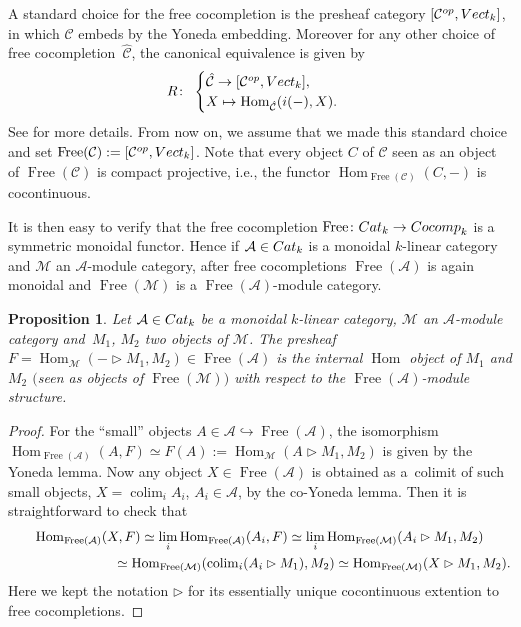 \documentclass[11pt]{article}
\numberwithin{equation}{section}
\numberwithin{equation}{section}
\newtheorem{Proposition}[Theorem]{Proposition}
 { \theoremstyle{definition}
\newtheorem{Definition}[Theorem]{Definition}
\newtheorem{Note}[Theorem]{Note}
\newtheorem{Example}[Theorem]{Example}
\newtheorem{Remark}[Theorem]{Remark} }
\newcommand{\Free}{\operatorname{Free}}
\newcommand{\colim}{\operatorname{colim}}
\newcommand{\Hom}{\operatorname{Hom}}
\begin{document}
\begin{Remark}\label{rmkFreeIsPresheaves}
A standard choice for the free cocompletion is the presheaf category $[\mathcal{C}^{\rm op},{\rm Vect}_k]$, in which $\mathcal{C}$ embeds by the Yoneda embedding. Moreover for any other choice of free cocompletion~$\hat{\mathcal{C}}$, the canonical equivalence is given by
\[
R\colon\ \begin{cases}
\hat{\mathcal{C}}  \to  [\mathcal{C}^{\rm op},{\rm Vect}_k],
\\
X \mapsto  \Hom_{\hat{\mathcal{C}}}(i(-),X).\end{cases}
\]
See \cite[Section~2.2]{Dugger} for more details. From now on, we assume that we made this standard choice and set $\Free(\mathcal{C}) := [\mathcal{C}^{\rm op},{\rm Vect}_k]$.
Note that every object $C$ of $\mathcal{C}$ seen as an object of $\Free(\mathcal{C})$ is compact projective, i.e., the functor $\Hom_{\Free(\mathcal{C})}(C,-)$ is cocontinuous.
\end{Remark}

It is then easy to verify that the free cocompletion $\Free\colon {\rm Cat}_k \to {\rm Cocomp}_k$ is a symmetric monoidal functor. Hence if $\mathcal{A} \in {\rm Cat}_k$ is a monoidal $k$-linear category and $\mathcal{M}$ an $\mathcal{A}$-module category, after free cocompletions $\Free(\mathcal{A})$ is again monoidal and $\Free(\mathcal{M})$ is a $\Free(\mathcal{A})$-module category.

\begin{Proposition}\label{propIntHomFree}
Let $\mathcal{A} \in {\rm Cat}_k$ be a monoidal $k$-linear category, $\mathcal{M}$ an $\mathcal{A}$-module category and~$M_1$, $M_2$ two objects of $\mathcal{M}$. The presheaf $F= \Hom_\mathcal{M}(-\rhd M_1,M_2) \in \Free(\mathcal{A})$ is the internal $\Hom$ object of $M_1$ and $M_2$ $($seen as objects of $\Free(\mathcal{M}))$ with respect to the $\Free(\mathcal{A})$-module structure.
\end{Proposition}

\begin{proof}
For the ``small'' objects $A \in \mathcal{A} \hookrightarrow \Free(\mathcal{A})$, the isomorphism $\Hom_{\Free(\mathcal{A})}(A,F)\simeq F(A) := \Hom_{\mathcal{M}}(A\rhd M_1,M_2)$ is given by the Yoneda lemma.
Now any object $X\in\Free(\mathcal{A})$ is obtained as a~colimit of such small objects, $X = \colim_i A_i$, $A_i \in \mathcal{A}$, by the co-Yoneda lemma. Then it is straight\-forward to check that
\begin{gather*}
\Hom_{\Free(\mathcal{A})}(X,F) \simeq \lim_i \Hom_{\Free(\mathcal{A})}(A_i,F) \simeq \lim_i \Hom_{\Free(\mathcal{M})}(A_i \rhd M_1,M_2)
\\ \hphantom{\Hom_{\Free(\mathcal{A})}(X,F)}
{}\simeq \Hom_{\Free(\mathcal{M})}(\colim_i (A_i \rhd M_1),M_2) \simeq \Hom_{\Free(\mathcal{M})}(X \rhd M_1,M_2).
\end{gather*}
Here we kept the notation $\rhd$ for its essentially unique cocontinuous extention to free cocompletions.
\end{proof}
\end{document}
